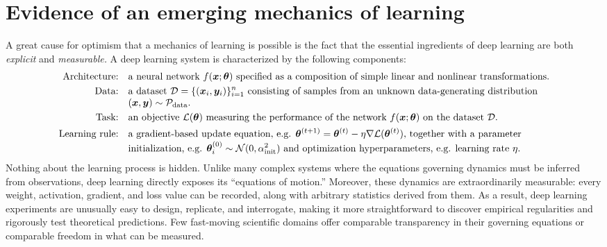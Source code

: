\section{Evidence of an emerging mechanics of learning}
\label{sec:reasons_why}


A great cause for optimism that a mechanics of learning is possible is the fact that the essential ingredients of deep learning are both \textit{explicit} and \textit{measurable.}
A deep learning system is characterized by the following components:
\begin{equation*}
    \begin{aligned}
    \text{Architecture:} \quad & \text{a neural network } f({\bm{x}};{\bm{\theta}}) \text{ specified as a composition of simple linear and nonlinear transformations.} \\
    \text{Data:} \quad & \text{a dataset } \mathcal{D} = \{({\bm{x}}_i, {\bm{y}}_i)\}_{i=1}^n \text{ consisting of samples from an unknown data-generating distribution }\\[-0.7ex]& ({\bm{x}},{\bm{y}}) \sim \mathcal{P}_{\mathrm{data}}. \\
    \text{Task:} \quad & \text{an objective } \mathcal{L}({\bm{\theta}}) \text{ measuring the performance of the network } f({\bm{x}};{\bm{\theta}}) \text{ on the dataset } \mathcal{D}. \\
    \text{Learning rule:} \quad & \text{a gradient-based update equation, e.g. }
    {\bm{\theta}}^{(t+1)} = {\bm{\theta}}^{(t)} - \eta \nabla \mathcal{L}({\bm{\theta}}^{(t)})
    \text{, together with a parameter} \\[-0.7ex]
    & \text{initialization, e.g. } {\bm{\theta}}^{(0)}_i \sim \mathcal{N}(0,\alpha^2_{\mathrm{init}}) \text{ and optimization hyperparameters, e.g. learning rate }\eta\text{.}
    \end{aligned}
\end{equation*}
Nothing about the learning process is hidden.
Unlike many complex systems where the equations governing dynamics must be inferred from observations, deep learning directly exposes its ``equations of motion.''
Moreover, these dynamics are extraordinarily measurable: every weight, activation, gradient, and loss value can be recorded, along with arbitrary statistics derived from them.
As a result, deep learning experiments are unusually easy to design, replicate, and interrogate, making it more straightforward to discover empirical regularities and rigorously test theoretical predictions.
Few fast-moving scientific domains offer comparable transparency in their governing equations or comparable freedom in what can be measured.


